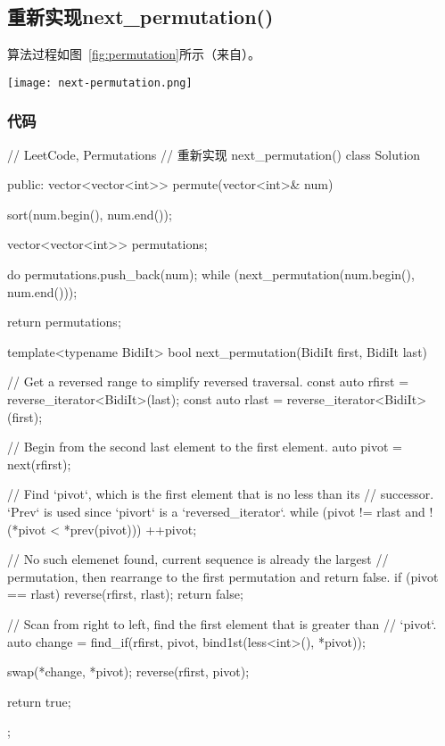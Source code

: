 \subsection{重新实现next_permutation()}
\label{sec:next-permutation-implement}
算法过程如图~\ref{fig:permutation}所示（来自）。

\begin{center}
\texttt{[image: next-permutation.png]}\\
\label{fig:permutation}
\end{center}


\subsubsection{代码}
\begin{Code}
// LeetCode, Permutations
// 重新实现 next_permutation()
class Solution {
public:
    vector<vector<int>> permute(vector<int>& num) {
        sort(num.begin(), num.end());

        vector<vector<int>> permutations;

        do {
            permutations.push_back(num);
        } while (next_permutation(num.begin(), num.end()));

        return permutations;
    }

    template<typename BidiIt>
    bool next_permutation(BidiIt first, BidiIt last) {
        // Get a reversed range to simplify reversed traversal.
        const auto rfirst = reverse_iterator<BidiIt>(last);
        const auto rlast = reverse_iterator<BidiIt>(first);

        // Begin from the second last element to the first element.
        auto pivot = next(rfirst);

        // Find `pivot`, which is the first element that is no less than its
        // successor.  `Prev` is used since `pivort` is a `reversed_iterator`.
        while (pivot != rlast and !(*pivot < *prev(pivot)))
            ++pivot;

        // No such elemenet found, current sequence is already the largest
        // permutation, then rearrange to the first permutation and return false.
        if (pivot == rlast) {
            reverse(rfirst, rlast);
            return false;
        }

        // Scan from right to left, find the first element that is greater than
        // `pivot`.
        auto change = find_if(rfirst, pivot, bind1st(less<int>(), *pivot));

        swap(*change, *pivot);
        reverse(rfirst, pivot);

        return true;
    }
};
\end{Code}


